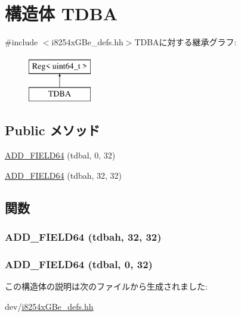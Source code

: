 \hypertarget{structiGbReg_1_1Regs_1_1TDBA}{
\section{構造体 TDBA}
\label{structiGbReg_1_1Regs_1_1TDBA}
}


{\ttfamily \#include $<$i8254xGBe\_\-defs.hh$>$}TDBAに対する継承グラフ:\begin{figure}[H]
\begin{center}
\leavevmode
\includegraphics[height=2cm]{structiGbReg_1_1Regs_1_1TDBA}
\end{center}
\end{figure}
\subsection*{Public メソッド}
\begin{DoxyCompactItemize}
\item 
\hyperlink{structiGbReg_1_1Regs_1_1TDBA_aae70d305325b7ad12ba65ce77604576a}{ADD\_\-FIELD64} (tdbal, 0, 32)
\item 
\hyperlink{structiGbReg_1_1Regs_1_1TDBA_a6488fb086a5064c80fd492461ec02a65}{ADD\_\-FIELD64} (tdbah, 32, 32)
\end{DoxyCompactItemize}


\subsection{関数}
\hypertarget{structiGbReg_1_1Regs_1_1TDBA_a6488fb086a5064c80fd492461ec02a65}{
\subsubsection[{ADD\_\-FIELD64}]{\setlength{\rightskip}{0pt plus 5cm}ADD\_\-FIELD64 (tdbah, \/  32, \/  32)}}
\label{structiGbReg_1_1Regs_1_1TDBA_a6488fb086a5064c80fd492461ec02a65}
\hypertarget{structiGbReg_1_1Regs_1_1TDBA_aae70d305325b7ad12ba65ce77604576a}{
\subsubsection[{ADD\_\-FIELD64}]{\setlength{\rightskip}{0pt plus 5cm}ADD\_\-FIELD64 (tdbal, \/  0, \/  32)}}
\label{structiGbReg_1_1Regs_1_1TDBA_aae70d305325b7ad12ba65ce77604576a}


この構造体の説明は次のファイルから生成されました:\begin{DoxyCompactItemize}
\item 
dev/\hyperlink{i8254xGBe__defs_8hh}{i8254xGBe\_\-defs.hh}\end{DoxyCompactItemize}
